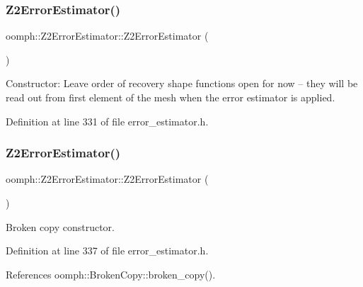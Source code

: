 \subsubsection{\texorpdfstring{Z2\+Error\+Estimator()}{Z2ErrorEstimator()}\hspace{0.1cm}{\footnotesize\ttfamily [2/3]}}
{\footnotesize\ttfamily oomph\+::\+Z2\+Error\+Estimator\+::\+Z2\+Error\+Estimator (\begin{DoxyParamCaption}{ }\end{DoxyParamCaption})\hspace{0.3cm}{\ttfamily [inline]}}



Constructor\+: Leave order of recovery shape functions open for now -- they will be read out from first element of the mesh when the error estimator is applied. 



Definition at line 331 of file error\+\_\+estimator.\+h.

\mbox{\label{classoomph_1_1Z2ErrorEstimator_a4eb88b73062ae5dd42c597569179aeae}} 
\subsubsection{\texorpdfstring{Z2\+Error\+Estimator()}{Z2ErrorEstimator()}\hspace{0.1cm}{\footnotesize\ttfamily [3/3]}}
{\footnotesize\ttfamily oomph\+::\+Z2\+Error\+Estimator\+::\+Z2\+Error\+Estimator (\begin{DoxyParamCaption}\item[{const \hyperlink{classoomph_1_1Z2ErrorEstimator}{Z2\+Error\+Estimator} \&}]{ }\end{DoxyParamCaption})\hspace{0.3cm}{\ttfamily [inline]}}



Broken copy constructor. 



Definition at line 337 of file error\+\_\+estimator.\+h.



References oomph\+::\+Broken\+Copy\+::broken\+\_\+copy().

\mbox{\label{classoomph_1_1Z2ErrorEstimator_a3d1e540fe046f1c55d59690932d4095d}} 
